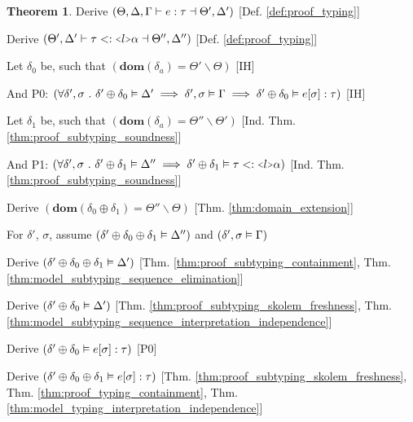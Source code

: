 \documentclass[acmsmall]{acmart}
\theoremstyle{definition}
\newtheorem{theorem}{Theorem}[section]
\begin{document}
\begin{theorem}
  \item \I \N Derive $(
    \Theta, \Delta, \Gamma \vdash e : \tau \dashv \Theta', \Delta'
  )$ [Def. \ref{def:proof_typing}]

  \item \I \N Derive $(
    \Theta', \Delta' \entails \tau \subtypes  \J{<} l \J{>} \alpha \given \Theta'', \Delta''
  )$ [Def. \ref{def:proof_typing}]


  \item \I \N Let $\delta_0$ be, such that $(
    \textbf{dom}(\delta_a) = \Theta' \backslash \Theta
  )$ [IH]

  \item \I \N And P0: $(
    \forall \delta', \sigma \ .\  
    \delta' \oplus \delta_0 \vDash \Delta' \implies
    \delta', \sigma \vDash \Gamma \implies
    \delta' \oplus \delta_0 \vDash e[\sigma] : \tau
  )$ [IH]

  \item \I \N Let $\delta_1$ be, such that $(
    \textbf{dom}(\delta_a) = \Theta'' \backslash \Theta'
  )$ [Ind. Thm. \ref{thm:proof_subtyping_soundness}]

  \item \I \N And P1: $(
    \forall \delta', \sigma \qua 
    \delta' \oplus \delta_1 \satisfies \Delta'' \implies
    \delta' \oplus \delta_1 \satisfies \tau \subtypes \J{<}l\J{>}\alpha
  )$ [Ind. Thm. \ref{thm:proof_subtyping_soundness}]

  \item \I \N Derive $(
    \textbf{dom}(\delta_0 \oplus \delta_1) = \Theta'' \backslash \Theta
  )$ [Thm. \ref{thm:domain_extension}]

  \item \I \N For $\delta'$, $\sigma$,
    assume $(\delta' \oplus \delta_0 \oplus \delta_1 \vDash \Delta'')$
    and $(\delta', \sigma \vDash \Gamma)$

  \item \I\I \N Derive $(
    \delta' \oplus \delta_0 \oplus \delta_1 \vDash \Delta'
  )$ [Thm. \ref{thm:proof_subtyping_containment}, Thm. \ref{thm:model_subtyping_sequence_elimination}]
  \item \I\I \N Derive $(
    \delta' \oplus \delta_0 \vDash \Delta'
  )$ [Thm. \ref{thm:proof_subtyping_skolem_freshness}, Thm. \ref{thm:model_subtyping_sequence_interpretation_independence}]
  \item \I\I \N Derive $(
    \delta' \oplus \delta_0 \vDash e[\sigma] : \tau
  )$ [P0]
  \item \I\I \N Derive $(
    \delta' \oplus \delta_0 \oplus \delta_1 \vDash e[\sigma] : \tau
  )$ [Thm. \ref{thm:proof_subtyping_skolem_freshness}, 
      Thm. \ref{thm:proof_typing_containment},
      Thm. \ref{thm:model_typing_interpretation_independence}]


\end{theorem}
\end{document}
